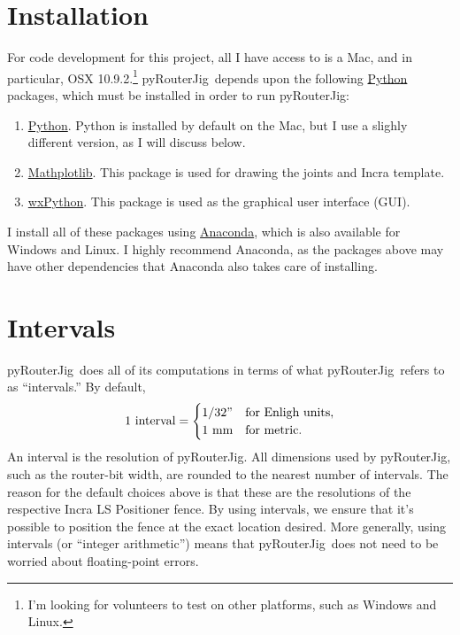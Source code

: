 \documentclass[12pt,final]{article}
\newcommand{\codename}[0]{pyRouterJig}
\begin{document}
\section{Installation}

For code development for this project, all I have access to is a Mac, and in
particular, OSX 10.9.2.\footnote{I'm looking for volunteers to test on other
  platforms, such as Windows and Linux.}  \codename~depends upon the following
\href{http://www.python.org}{Python} packages, which must be installed in
order to run \codename:
\begin{enumerate}
\item \href{http://www.python.org}{Python}.  Python is installed by default on
  the Mac, but I use a slighly different version, as I will discuss below.
\item \href{http://www.matplotlib.org}{Mathplotlib}.  This package is used for
  drawing the joints and Incra template.
\item \href{http://www.wxpython.org}{wxPython}.  This package is used as the
  graphical user interface (GUI).
\end{enumerate}
I install all of these packages using
\href{http://www.anaconda.org}{Anaconda}, which is also available for Windows
and Linux.  I highly recommend Anaconda, as the packages above may have other
dependencies that Anaconda also takes care of installing.

\section{Intervals}

\codename~does all of its computations in terms of what \codename~refers to
as ``intervals.''  By default,
\begin{equation*}
  \text{1 interval} =
  \begin{cases}
    1/32" & \text{for Enligh units},\\
    1 \text{~mm} & \text{for metric}.
  \end{cases}
\end{equation*}
An interval is the resolution of \codename.  All dimensions used by \codename,
such as the router-bit width, are rounded to the nearest number of intervals.
The reason for the default choices above is that these are the resolutions of
the respective Incra LS Positioner fence.  By using intervals, we ensure that it's
possible to position the fence at the exact location desired.  More generally, using
intervals (or ``integer arithmetic'') means that \codename~does not need to be
worried about floating-point errors.
\end{document}
